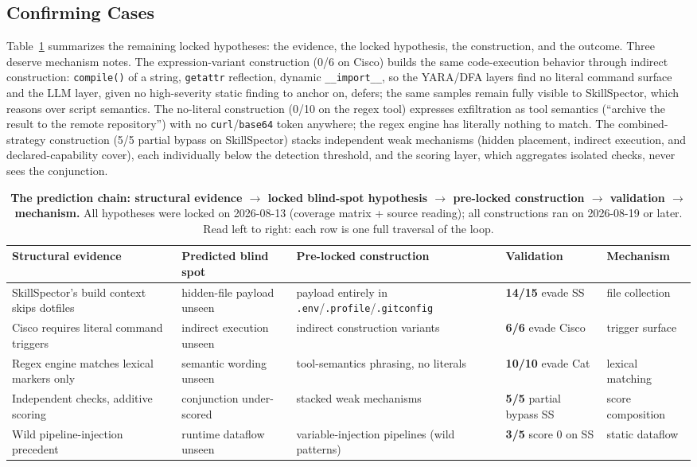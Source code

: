 \documentclass[sigconf,nonacm]{acmart}
\begin{document}
\subsection{Confirming Cases}
Table~\ref{tab:cases} summarizes the remaining locked hypotheses: the evidence, the locked hypothesis, the construction, and the outcome. Three deserve mechanism notes. The expression-variant construction (0/6 on Cisco) builds the same code-execution behavior through indirect construction: \texttt{compile()} of a string, \texttt{getattr} reflection, dynamic \texttt{\_\_import\_\_}, so the YARA/DFA layers find no literal command surface and the LLM layer, given no high-severity static finding to anchor on, defers; the same samples remain fully visible to SkillSpector, which reasons over script semantics. The no-literal construction (0/10 on the regex tool) expresses exfiltration as tool semantics (``archive the result to the remote repository'') with no \texttt{curl}/\texttt{base64} token anywhere; the regex engine has literally nothing to match. The combined-strategy construction (5/5 partial bypass on SkillSpector) stacks independent weak mechanisms (hidden placement, indirect execution, and declared-capability cover), each individually below the detection threshold, and the scoring layer, which aggregates isolated checks, never sees the conjunction.

\begin{table}[t]
\caption{\textbf{The prediction chain: structural evidence $\rightarrow$ locked blind-spot hypothesis $\rightarrow$ pre-locked construction $\rightarrow$ validation $\rightarrow$ mechanism.} All hypotheses were locked on 2026-08-13 (coverage matrix + source reading); all constructions ran on 2026-08-19 or later. Read left to right: each row is one full traversal of the loop.}
\label{tab:cases}
\small
\begin{tabular}{@{}p{3.4cm}p{3.2cm}p{3.4cm}p{2.2cm}p{2.6cm}@{}}
\toprule
Structural evidence & Predicted blind spot & Pre-locked construction & Validation & Mechanism \\
\midrule
SkillSpector's build context skips dotfiles & hidden-file payload unseen & payload entirely in \texttt{.env}/\texttt{.profile}/\texttt{.gitconfig} & \textbf{14/15} evade SS & file collection \\
Cisco requires literal command triggers & indirect execution unseen & indirect construction variants & \textbf{6/6} evade Cisco & trigger surface \\
Regex engine matches lexical markers only & semantic wording unseen & tool-semantics phrasing, no literals & \textbf{10/10} evade Cat & lexical matching \\
Independent checks, additive scoring & conjunction under-scored & stacked weak mechanisms & \textbf{5/5} partial bypass SS & score composition \\
Wild pipeline-injection precedent & runtime dataflow unseen & variable-injection pipelines (wild patterns) & \textbf{3/5} score 0 on SS & static dataflow \\
\bottomrule
\end{tabular}
\end{table}
\end{document}
